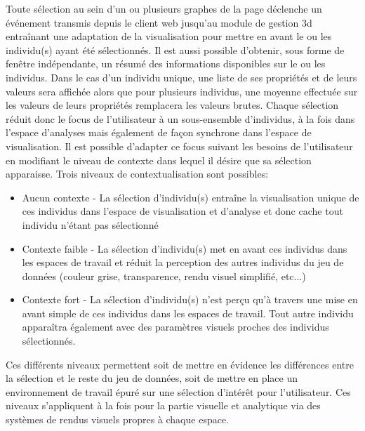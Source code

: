 Toute sélection au sein d'un ou plusieurs graphes de la page déclenche un événement transmis depuis le client web jusqu'au module de gestion 3d entraînant une adaptation de la visualisation pour mettre en avant le ou les individu(s) ayant été sélectionnés. Il est aussi possible d'obtenir, sous forme de fenêtre indépendante, un résumé des informations disponibles sur le ou les individus. Dans le cas d'un individu unique, une liste de ses propriétés et de leurs valeurs sera affichée alors que pour plusieurs individus, une moyenne effectuée sur les valeurs de leurs propriétés remplacera les valeurs brutes.
Chaque sélection réduit donc le focus de l'utilisateur à un sous-ensemble d'individus, à la fois dans l'espace d'analyses mais également de façon synchrone dans l'espace de visualisation. Il est possible d'adapter ce focus suivant les besoins de l'utilisateur en modifiant le niveau de contexte dans lequel il désire que sa sélection apparaisse. Trois niveaux de contextualisation sont possibles:
\begin{itemize}
	\item Aucun contexte - La sélection d'individu(s) entraîne la visualisation unique de ces individus dans l'espace de visualisation et d'analyse et donc cache tout individu n'étant pas sélectionné
	\item Contexte faible - La sélection d'individu(s) met en avant ces individus dans les espaces de travail et réduit la perception des autres individus du jeu de données (couleur grise, transparence, rendu visuel simplifié, etc...)
	\item Contexte fort - La sélection d'individu(s) n'est perçu qu'à travers une mise en avant simple de ces individus dans les espaces de travail. Tout autre individu apparaîtra également avec des paramètres visuels proches des individus sélectionnés.
\end{itemize}

Ces différents niveaux permettent soit de mettre en évidence les différences entre la sélection et le reste du jeu de données, soit de mettre en place un environnement de travail épuré sur une sélection d’intérêt pour l'utilisateur. Ces niveaux s'appliquent à la fois pour la partie visuelle et analytique via des systèmes de rendus visuels propres à chaque espace.

